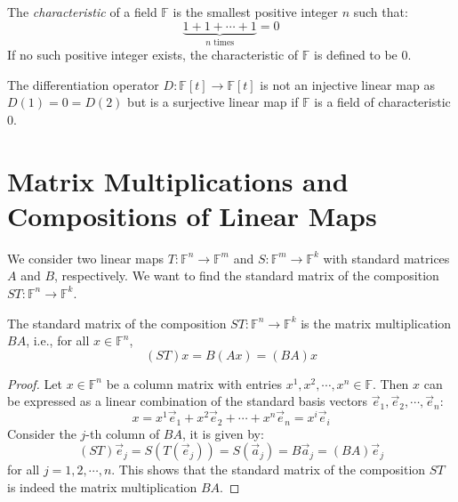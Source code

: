\documentclass[
	11pt, %
	fleqn, %
	a4paper, %
]{LegrandOrangeBook}
\newcommand{\F}{\mathbb{F}} %
\begin{document}
\begin{definition}
    The \emph{characteristic} of a field $\F$ is the smallest positive integer $n$ such that:
    \[
        \underbrace{1 + 1 + \cdots + 1}_{n \text{ times}} = 0
    \]
    If no such positive integer exists, the characteristic of $\F$ is defined to be $0$.    
\end{definition}

\begin{example}
    The differentiation operator $D: \F[t] \to \F[t]$ is not an injective linear map as $D(1) = 0 = D(2)$ but is a surjective linear map if $\F$ is a field of characteristic $0$.
\end{example}


\newpage

\section{Matrix Multiplications and Compositions of Linear Maps}

We consider two linear maps $T: \F^n \to \F^m$ and $S: \F^m \to \F^k$ with standard matrices $A$ and $B$, respectively. We want to find the standard matrix of the composition $ST: \F^n \to \F^k$.

\begin{center}
\end{center}

\begin{proposition}
    The standard matrix of the composition $ST: \F^n \to \F^k$ is the matrix multiplication $BA$, i.e., for all $x \in \F^n$,
    \[
        (ST)x = B(Ax) = (BA)x
    \]
\end{proposition}

\begin{proof}
    Let $x \in \F^n$ be a column matrix with entries $x^1, x^2, \cdots, x^n \in \F$. Then $x$ can be expressed as a linear combination of the standard basis vectors $\vec{e}_1, \vec{e}_2, \cdots, \vec{e}_n$:
    \[
        x = x^1 \vec{e}_1 + x^2 \vec{e}_2 + \cdots + x^n \vec{e}_n = x^i \vec{e}_i
    \]
    Consider the $j$-th column of $BA$, it is given by:
    \[
        (ST)\vec{e}_j = S(T(\vec{e}_j)) = S(\vec{a}_j) = B\vec{a}_j = (BA)\vec{e}_j
    \]
    for all $j = 1, 2, \cdots, n$. This shows that the standard matrix of the composition $ST$ is indeed the matrix multiplication $BA$.
\end{proof}
\end{document}
